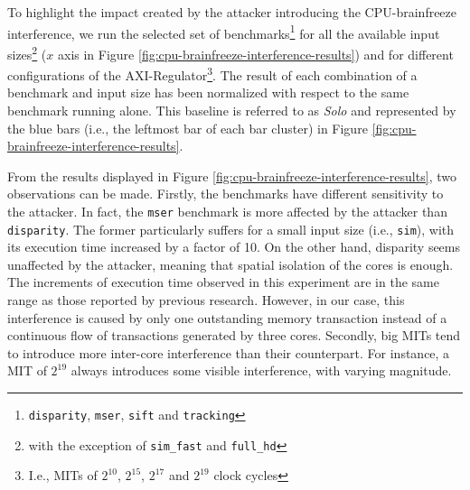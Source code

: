 
    To highlight the impact created by the attacker introducing the CPU-brainfreeze interference, we run the selected set of benchmarks\footnote{\texttt{disparity}, \texttt{mser}, \texttt{sift} and \texttt{tracking}} for all the available input sizes\footnote{with the exception of \texttt{sim\_fast} and \texttt{full\_hd}} ($x$ axis in Figure \ref{fig:cpu-brainfreeze-interference-results}) and for different configurations of the AXI-Regulator\footnote{I.e., MITs of $2^{10}$, $2^{15}$, $2^{17}$ and $2^{19}$ clock cycles}.
    The result of each combination of a benchmark and input size has been normalized with respect to the same benchmark running alone.
    This baseline is referred to as \emph{Solo} and represented by the blue bars (i.e., the leftmost bar of each bar cluster) in Figure \ref{fig:cpu-brainfreeze-interference-results}.

    From the results displayed in Figure \ref{fig:cpu-brainfreeze-interference-results}, two observations can be made.
    Firstly, the benchmarks have different sensitivity to the attacker. In fact, the \texttt{mser} benchmark is more affected by the attacker than \texttt{disparity}.
    The former particularly suffers for a small input size (i.e., \texttt{sim}), with its execution time increased by a factor of 10.
    On the other hand, disparity seems unaffected by the attacker, meaning that spatial isolation of the cores is enough.
    The increments of execution time observed in this experiment are in the same range as those reported by previous research.
    However, in our case, this interference is caused by only one outstanding memory transaction instead of a continuous flow of transactions generated by three cores.
    Secondly, big MITs tend to introduce more inter-core interference than their counterpart. For instance, a MIT of $2^{19}$ always introduces some visible interference, with varying magnitude.\\

